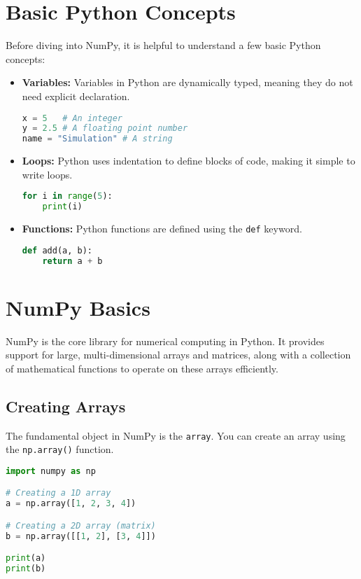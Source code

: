 \section{Basic Python Concepts}
Before diving into NumPy, it is helpful to understand a few basic Python concepts:
\begin{itemize}
    \item \textbf{Variables:} Variables in Python are dynamically typed, meaning they do not need explicit declaration.
    \begin{lstlisting}[language=Python, style=mystyle2]
x = 5   # An integer
y = 2.5 # A floating point number
name = "Simulation" # A string
    \end{lstlisting}
    \item \textbf{Loops:} Python uses indentation to define blocks of code, making it simple to write loops.
    \begin{lstlisting}[language=Python, style=mystyle2]
for i in range(5):
    print(i)
    \end{lstlisting}
    \item \textbf{Functions:} Python functions are defined using the \texttt{def} keyword.
    \begin{lstlisting}[language=Python, style=mystyle2]
def add(a, b):
    return a + b
    \end{lstlisting}
\end{itemize}

\section{NumPy Basics}
NumPy is the core library for numerical computing in Python. It provides support for large, multi-dimensional arrays and matrices, along with a collection of mathematical functions to operate on these arrays efficiently.

\subsection{Creating Arrays}
The fundamental object in NumPy is the \texttt{array}. You can create an array using the \texttt{np.array()} function.
\begin{lstlisting}[language=Python, style=mystyle2]
import numpy as np

# Creating a 1D array
a = np.array([1, 2, 3, 4])

# Creating a 2D array (matrix)
b = np.array([[1, 2], [3, 4]])

print(a)
print(b)
\end{lstlisting}

